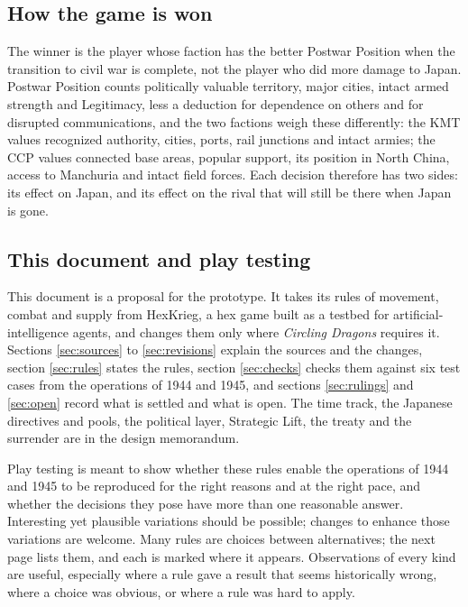 \documentclass[11pt]{article}
\begin{document}
\subsection*{How the game is won}
The winner is the player whose faction has the better Postwar Position when the transition to civil war is complete, not the player who did more damage to Japan. Postwar Position counts politically valuable territory, major cities, intact armed strength and Legitimacy, less a deduction for dependence on others and for disrupted communications, and the two factions weigh these differently: the KMT values recognized authority, cities, ports, rail junctions and intact armies; the CCP values connected base areas, popular support, its position in North China, access to Manchuria and intact field forces. Each decision therefore has two sides: its effect on Japan, and its effect on the rival that will still be there when Japan is gone.

\subsection*{This document and play testing}
This document is a proposal for the prototype. It takes its rules of movement, combat and supply from HexKrieg, a hex game built as a testbed for artificial-intelligence agents, and changes them only where \emph{Circling Dragons} requires it. Sections \ref{sec:sources} to \ref{sec:revisions} explain the sources and the changes, section \ref{sec:rules} states the rules, section \ref{sec:checks} checks them against six test cases from the operations of 1944 and 1945, and sections \ref{sec:rulings} and \ref{sec:open} record what is settled and what is open. The time track, the Japanese directives and pools, the political layer, Strategic Lift, the treaty and the surrender are in the design memorandum.

Play testing is meant to show whether these rules enable the operations of 1944 and 1945 to be reproduced for the right reasons and at the right pace, and whether the decisions they pose have more than one reasonable answer.
Interesting yet plausible variations should be possible; changes to enhance those variations are welcome.
Many rules are choices between alternatives; the next page lists them, and each is marked where it appears. Observations of every kind are useful, especially where a rule gave a result that seems historically wrong, where a choice was obvious, or where a rule was hard to apply.
\clearpage
\end{document}
